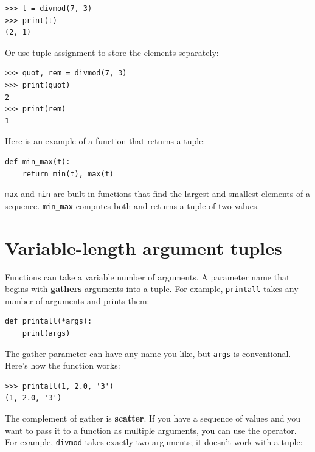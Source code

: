 \documentclass[10pt]{book}
\begin{document}
\beforeverb
\begin{verbatim}
>>> t = divmod(7, 3)
>>> print(t)
(2, 1)
\end{verbatim}
\afterverb
%
Or use tuple assignment to store the elements separately:


\beforeverb
\begin{verbatim}
>>> quot, rem = divmod(7, 3)
>>> print(quot)
2
>>> print(rem)
1
\end{verbatim}
\afterverb
%
Here is an example of a function that returns a tuple:

\beforeverb
\begin{verbatim}
def min_max(t):
    return min(t), max(t)
\end{verbatim}
\afterverb
%
{\tt max} and {\tt min} are built-in functions that find
the largest and smallest elements of a sequence.  \verb"min_max"
computes both and returns a tuple of two values.



\section{Variable-length argument tuples}


Functions can take a variable number of arguments.  A parameter
name that begins with {\tt *} {\bf gathers} arguments into
a tuple.  For example, {\tt printall}
takes any number of arguments and prints them:

\beforeverb
\begin{verbatim}
def printall(*args):
    print(args)
\end{verbatim}
\afterverb
%
The gather parameter can have any name you like, but {\tt args} is
conventional.  Here's how the function works:

\beforeverb
\begin{verbatim}
>>> printall(1, 2.0, '3')
(1, 2.0, '3')
\end{verbatim}
\afterverb
%
The complement of gather is {\bf scatter}.  If you have a
sequence of values and you want to pass it to a function
as multiple arguments, you can use the {\tt *} operator.
For example, {\tt divmod} takes exactly two arguments; it
doesn't work with a tuple:
\end{document}
